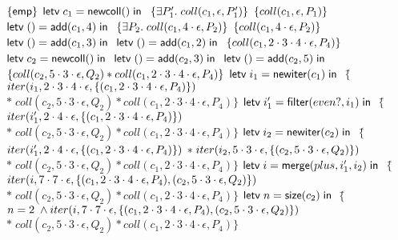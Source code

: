 \begin{specification}
\nextline
 $\{{\mathsf{emp}}\}$  
 $\mathsf{letv}\;c_1 = \mathsf{newcoll}()\;\mathsf{in}\;$  \nextline
 $\{{\exists P'_1.\; coll(c_1, \epsilon, P'_1)}\}$  
 $\{{coll(c_1, \epsilon, P_1)}\}$  
 $\mathsf{letv}\;() = \mathsf{add}(c_1, 4)\;\mathsf{in}\;$  \nextline
 $\{{\exists P_2.\; coll(c_1, 4\cdot\epsilon, P_2)}\}$  
  $\{{coll(c_1, 4\cdot\epsilon, P_2)}\}$  
 $\mathsf{letv}\;() = \mathsf{add}(c_1, 3)\;\mathsf{in}\;$  \nextline
 $\mathsf{letv}\;() = \mathsf{add}(c_1, 2)\;\mathsf{in}\;$  \nextline
 $\{{coll(c_1, 2\cdot3\cdot4\cdot\epsilon, P_4)}\}$  
 $\mathsf{letv}\;c_2 = \mathsf{newcoll}()\;\mathsf{in}\;$  \nextline
 $\mathsf{letv}\;() = \mathsf{add}(c_2, 3)\;\mathsf{in}\;$  
 $\mathsf{letv}\;() = \mathsf{add}(c_2, 5)\;\mathsf{in}\;$  
 $\{{coll(c_2, 5\cdot3\cdot\epsilon, Q_2) * coll(c_1, 2\cdot3\cdot4\cdot\epsilon, P_4)}\}$  
 $\mathsf{letv}\;i_1 = \mathsf{newiter}(c_1)\;\mathsf{in}\;$  
 $\{$\=$iter(i_1, 2\cdot3\cdot4\cdot\epsilon, \{{(c_1, 2\cdot3\cdot4\cdot\epsilon, P_4)}\})$
 \nextline 
 \>$*\; coll(c_2, 5\cdot3\cdot\epsilon, Q_2) * coll(c_1, 2\cdot3\cdot4\cdot\epsilon, P_4)\}$  
 $\mathsf{letv}\;i'_1 = \mathsf{filter}(even?, i_1)\;\mathsf{in}\;$  
 $\{$\=$iter(i'_1, 2\cdot4\cdot\epsilon, \{{(c_1, 2\cdot3\cdot4\cdot\epsilon, P_4)}\})$  \nextline
  \>$*\; coll(c_2, 5\cdot3\cdot\epsilon, Q_2) * coll(c_1, 2\cdot3\cdot4\cdot\epsilon, P_4)\}$ 
 $\mathsf{letv}\;i_2 = \mathsf{newiter}(c_2)\;\mathsf{in}\;$  
 $\{$\=$iter(i'_1, 2\cdot4\cdot\epsilon, \{{(c_1, 2\cdot3\cdot4\cdot\epsilon, P_4)}\})$ \nextline
  \>$*\;iter(i_2, 5\cdot3\cdot\epsilon, \{{(c_2, 5\cdot3\cdot\epsilon, Q_2)}\})$  \nextline
 \>$*\;coll(c_2, 5\cdot3\cdot\epsilon, Q_2) * coll(c_1, 2\cdot3\cdot4\cdot\epsilon, P_4)\}$  
 $\mathsf{letv}\;i = \mathsf{merge}(plus, i'_1, i_2)\;\mathsf{in}\;$  \nextline
 $\{$\=$iter(i, 7\cdot7\cdot\epsilon, \{{(c_1, 2\cdot3\cdot4\cdot\epsilon, P_4), (c_2, 5\cdot3\cdot\epsilon, Q_2)}\})$  \nextline
 \> $*\; coll(c_2, 5\cdot3\cdot\epsilon, Q_2) * coll(c_1, 2\cdot3\cdot4\cdot\epsilon, P_4)\}$  
 $\mathsf{letv}\;n = \mathsf{size}(c_2)\;\mathsf{in}\;$  \nextline
 $\{$\=$n = 2 \;\land
iter(i, 7\cdot7\cdot\epsilon, \{{(c_1, 2\cdot3\cdot4\cdot\epsilon, P_4), (c_2, 5\cdot3\cdot\epsilon, Q_2)}\})$ \nextline
\>$*\;coll(c_2, 5\cdot3\cdot\epsilon, Q_2) * coll(c_1, 2\cdot3\cdot4\cdot\epsilon, P_4)\}$  


\end{specification}
